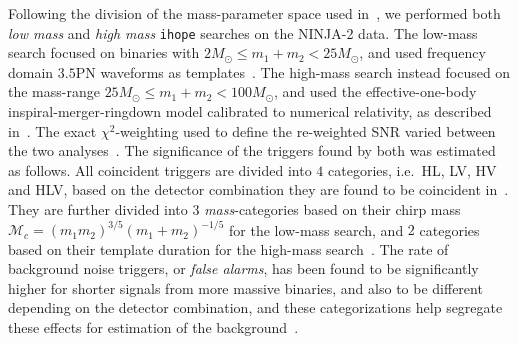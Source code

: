\documentclass[12pt]{iopart}
\newcommand{\ihope}{\texttt{ihope}}
\begin{document}
Following the division of the mass-parameter space used 
in~\cite{Colaboration:2011np, Aasi:2012rja}, we performed both \emph{low 
mass} and \emph{high mass} \ihope{} searches on the NINJA-2 data. The low-mass 
search focused on binaries with $2M_\odot
\leq m_{1}+m_{2} < 25M_\odot$, and used frequency domain $3.5$PN 
waveforms as templates~\cite{Blanchet:2001ax, Blanchet:2001aw, Blanchet:2004ek}.
The high-mass search instead focused on the mass-range 
$25M_\odot \leq m_{1}+m_{2} < 100M_\odot$, and used the effective-one-body
inspiral-merger-ringdown model calibrated to numerical relativity, as described 
in~\cite{Buonanno:2007pf}. The exact $\chi^2$-weighting used to define the
re-weighted SNR varied between the two analyses~\cite{Babak:2012zx}. The 
significance of the triggers found by both was estimated as follows.
All coincident triggers are divided into $4$ 
categories, i.e.\ HL, LV, HV and HLV, based on the detector combination they are 
found to be coincident in~\cite{Colaboration:2011np}. They are further divided 
into
$3$ \textit{mass}-categories based on their chirp mass
$\mathcal{M}_{c}=(m_{1}m_{2})^{3/5}(m_{1}+m_{2})^{-1/5}$ for the low-mass 
search, and $2$ categories based on their template duration for the high-mass 
search~\cite{Colaboration:2011np}. The rate of background noise triggers, or 
\textit{false alarms}, has been found to be significantly higher for shorter 
signals from more massive binaries, and also to be different depending on the 
detector
combination, and these categorizations help segregate these effects for 
estimation of
the background~\cite{Colaboration:2011np,Babak:2012zx}. 
\end{document}
